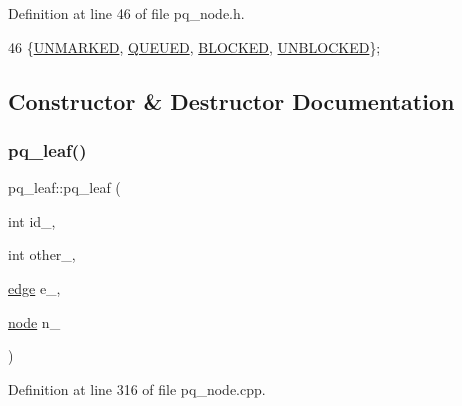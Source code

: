 Definition at line 46 of file pq\+\_\+node.\+h.


\begin{DoxyCode}
46 \{\mbox{\hyperlink{classpq__node_a6236b20cd5f6cc02cb5f637ed34c96d9a7fbe5f6a363f9f2b5a154c61b2389d59}{UNMARKED}}, \mbox{\hyperlink{classpq__node_a6236b20cd5f6cc02cb5f637ed34c96d9a8fcc16097c37da3379fcd0a0c16fe169}{QUEUED}}, \mbox{\hyperlink{classpq__node_a6236b20cd5f6cc02cb5f637ed34c96d9a70312622ded9f04f068838ec195fc53c}{BLOCKED}}, \mbox{\hyperlink{classpq__node_a6236b20cd5f6cc02cb5f637ed34c96d9a8a88820f8cee58f43fef7160cdf1d7dc}{UNBLOCKED}}\};
\end{DoxyCode}


\subsection{Constructor \& Destructor Documentation}
\mbox{\label{classpq__leaf_a5478f8f28b4661ec404c492a01ac1f34}} 
\subsubsection{\texorpdfstring{pq\+\_\+leaf()}{pq\_leaf()}}
{\footnotesize\ttfamily pq\+\_\+leaf\+::pq\+\_\+leaf (\begin{DoxyParamCaption}\item[{int}]{id\+\_\+,  }\item[{int}]{other\+\_\+,  }\item[{\mbox{\hyperlink{classedge}{edge}}}]{e\+\_\+,  }\item[{\mbox{\hyperlink{classnode}{node}}}]{n\+\_\+ }\end{DoxyParamCaption})}



Definition at line 316 of file pq\+\_\+node.\+cpp.


